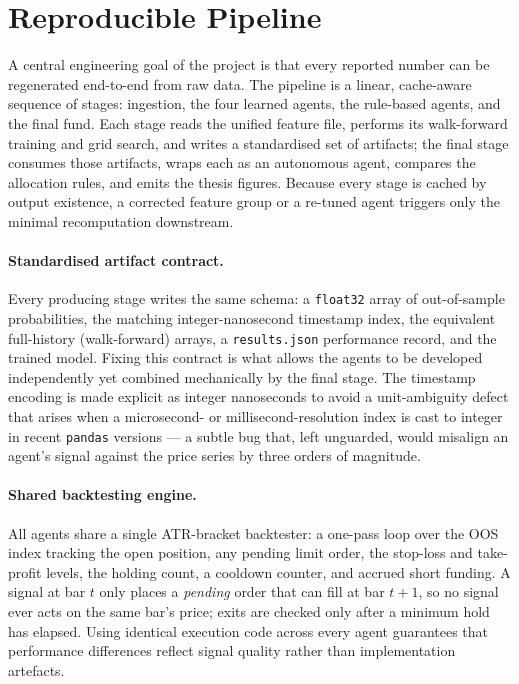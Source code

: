 \section{Reproducible Pipeline}
\label{sec:reproducibility}

A central engineering goal of the project is that every reported number can be regenerated end-to-end from raw data. The pipeline is a linear, cache-aware sequence of stages: ingestion, the four learned agents, the rule-based agents, and the final fund. Each stage reads the unified feature file, performs its walk-forward training and grid search, and writes a standardised set of artifacts; the final stage consumes those artifacts, wraps each as an autonomous agent, compares the allocation rules, and emits the thesis figures. Because every stage is cached by output existence, a corrected feature group or a re-tuned agent triggers only the minimal recomputation downstream.

\paragraph{Standardised artifact contract.}
Every producing stage writes the same schema: a \texttt{float32} array of out-of-sample probabilities, the matching integer-nanosecond timestamp index, the equivalent full-history (walk-forward) arrays, a \texttt{results.json} performance record, and the trained model. Fixing this contract is what allows the agents to be developed independently yet combined mechanically by the final stage. The timestamp encoding is made explicit as integer nanoseconds to avoid a unit-ambiguity defect that arises when a microsecond- or millisecond-resolution index is cast to integer in recent \texttt{pandas} versions --- a subtle bug that, left unguarded, would misalign an agent's signal against the price series by three orders of magnitude.

\paragraph{Shared backtesting engine.}
All agents share a single ATR-bracket backtester: a one-pass loop over the OOS index tracking the open position, any pending limit order, the stop-loss and take-profit levels, the holding count, a cooldown counter, and accrued short funding. A signal at bar $t$ only places a \textit{pending} order that can fill at bar $t+1$, so no signal ever acts on the same bar's price; exits are checked only after a minimum hold has elapsed. Using identical execution code across every agent guarantees that performance differences reflect signal quality rather than implementation artefacts.

